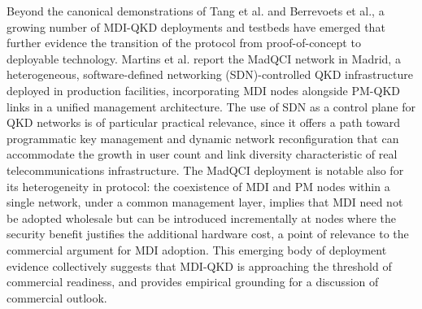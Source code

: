 \documentclass[9pt,technote]{IEEEtran}
\begin{document}
Beyond the canonical demonstrations of Tang et al. and Berrevoets et al., a growing number of MDI-QKD deployments and testbeds have emerged that further evidence the transition of the protocol from proof-of-concept to deployable technology. Martins et al. \cite{Martins2024} report the MadQCI network in Madrid, a heterogeneous, software-defined networking (SDN)-controlled QKD infrastructure deployed in production facilities, incorporating MDI nodes alongside PM-QKD links in a unified management architecture. The use of SDN as a control plane for QKD networks is of particular practical relevance, since it offers a path toward programmatic key management and dynamic network reconfiguration that can accommodate the growth in user count and link diversity characteristic of real telecommunications infrastructure. The MadQCI deployment is notable also for its heterogeneity in protocol: the coexistence of MDI and PM nodes within a single network, under a common management layer, implies that MDI need not be adopted wholesale but can be introduced incrementally at nodes where the security benefit justifies the additional hardware cost, a point of relevance to the commercial argument for MDI adoption. This emerging body of deployment evidence collectively suggests that MDI-QKD is approaching the threshold of commercial readiness, and provides empirical grounding for a discussion of commercial outlook.
\end{document}
